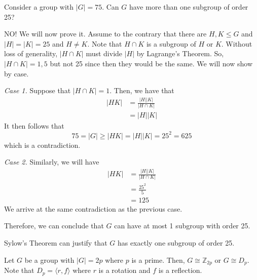 \begin{nexample}
    Consider a group with \(|G| = 75\). Can \(G\) have more than one subgroup of order 25?

    NO! We will now prove it. Assume to the contrary that there are \(H, K \leq G\) and \(|H| = |K| = 25\) and \(H \neq K\). Note that \(H \cap K\) is a subgroup of \(H\) or \(K\). Without loss of generality, \(|H \cap K|\) must divide \(|H|\) by Lagrange's Theorem. So, \(|H \cap K| = 1, 5\) but not 25 since then they would be the same. We will now show by case.

    \textit{Case 1.} Suppose that \(|H \cap K| = 1\). Then, we have that
    \[
    \begin{aligned}
        |HK| &= \frac{|H||K|}{|H \cap K|} \\
             &= |H||K|
    \end{aligned}
    \]
    It then follows that
    \[
        75 = |G| \geq |HK| = |H||K| = 25^2 = 625
    \]
    which is a contradiction.

    \textit{Case 2.} Similarly, we will have
    \[
    \begin{aligned}
        |HK| &= \frac{|H||K|}{|H \cap K|} \\
             &= \frac{25^2}{5} \\
             &= 125
    \end{aligned}
    \]
    We arrive at the same contradiction as the previous case.

    Therefore, we can conclude that \(G\) can have at most 1 subgroup with order 25.
\end{nexample}

\begin{remark}
    Sylow's Theorem can justify that \(G\) has exactly one subgroup of order 25.
\end{remark}

\begin{theorem}
    Let \(G\) be a group with \(|G| = 2p\) where \(p\) is a prime. Then, \(G \cong \mathbb{Z}_{2p}\) or \(G \cong D_p\). Note that \(D_p = \langle r, f \rangle\) where \(r\) is a rotation and \(f\) is a reflection.
\end{theorem}

